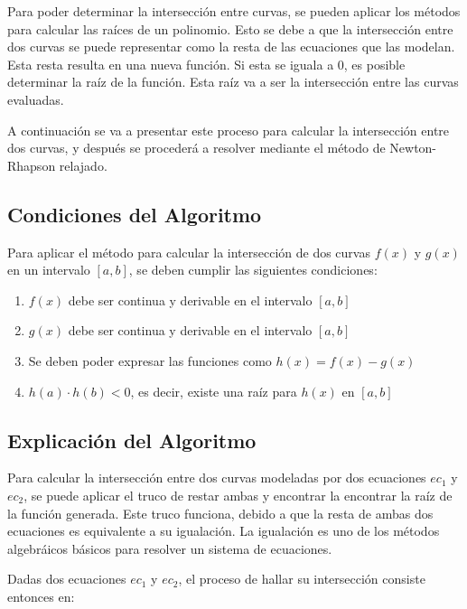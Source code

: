 \documentclass[a4paper,12pt]{article}
\begin{document}
Para poder determinar la intersección entre curvas, se pueden aplicar los métodos para calcular las raíces de un polinomio. Esto se debe a que la intersección entre dos curvas se puede representar como la resta de las ecuaciones que las modelan. Esta resta resulta en una nueva función. Si esta se iguala a 0, es posible determinar la raíz de la función. Esta raíz va a ser la intersección entre las curvas evaluadas. \par 

A continuación se va a presentar este proceso para calcular la intersección entre dos curvas, y después se procederá a resolver mediante el método de Newton-Rhapson relajado. \par 

\subsection{Condiciones del Algoritmo}

Para aplicar el método para calcular la intersección de dos curvas $f(x)$ y $g(x)$ en un intervalo $[a,b]$, se deben cumplir las siguientes condiciones:

\begin{enumerate}
    \item $f(x)$ debe ser continua y derivable en el intervalo $[a,b]$
    \item $g(x)$ debe ser continua y derivable en el intervalo $[a,b]$
    \item Se deben poder expresar las funciones como $h(x)=f(x)-g(x)$
    \item $h(a) \cdotp h(b) < 0$, es decir, existe una raíz para $h(x)$ en $[a,b]$
\end{enumerate}

\subsection{Explicación del Algoritmo}

Para calcular la intersección entre dos curvas modeladas por dos ecuaciones $ec_1$ y $ec_2$, se puede aplicar el truco de restar ambas y encontrar la encontrar la raíz de la función generada. Este truco funciona, debido a que la resta de ambas dos ecuaciones es equivalente a su igualación. La igualación es uno de los métodos algebráicos básicos para resolver un sistema de ecuaciones. \par

Dadas dos ecuaciones  $ec_1$ y $ec_2$, el proceso de hallar su intersección consiste entonces en: \par
\end{document}
